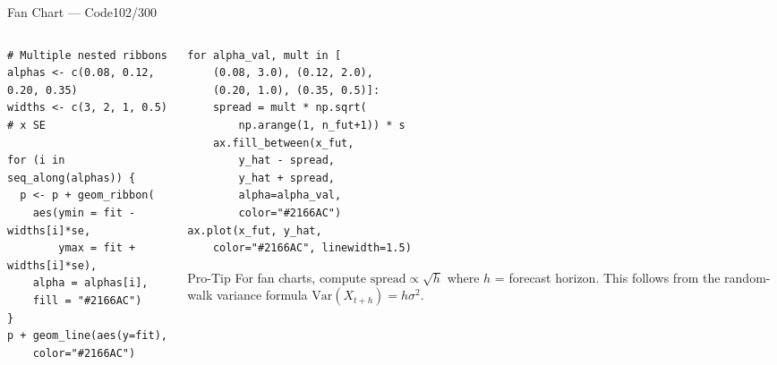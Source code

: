 \documentclass[10pt]{beamer}
\newcommand{\smark}[1]{\hfill{\scriptsize\color{codegray}#1}}
\begin{document}
\begin{frame}[fragile]{Fan Chart --- Code}\smark{102/300}
\begin{columns}[T]
\begin{column}{0.48\textwidth}
\begin{lstlisting}[style=Rstyle]
# Multiple nested ribbons
alphas <- c(0.08, 0.12, 0.20, 0.35)
widths <- c(3, 2, 1, 0.5) # x SE

for (i in seq_along(alphas)) {
  p <- p + geom_ribbon(
    aes(ymin = fit - widths[i]*se,
        ymax = fit + widths[i]*se),
    alpha = alphas[i],
    fill = "#2166AC")
}
p + geom_line(aes(y=fit),
    color="#2166AC")
\end{lstlisting}
\end{column}
\begin{column}{0.48\textwidth}
\begin{lstlisting}[style=Pystyle]
for alpha_val, mult in [
    (0.08, 3.0), (0.12, 2.0),
    (0.20, 1.0), (0.35, 0.5)]:
    spread = mult * np.sqrt(
        np.arange(1, n_fut+1)) * s
    ax.fill_between(x_fut,
        y_hat - spread,
        y_hat + spread,
        alpha=alpha_val,
        color="#2166AC")
ax.plot(x_fut, y_hat,
    color="#2166AC", linewidth=1.5)
\end{lstlisting}
\vspace{0.1cm}
\begin{alertblock}{Pro-Tip}
    \scriptsize For fan charts, compute $\text{spread} \propto \sqrt{h}$ where $h$ = forecast horizon. This follows from the random-walk variance formula $\text{Var}(X_{t+h}) = h \sigma^2$.
\end{alertblock}
\end{column}
\end{columns}
\end{frame}
\end{document}
